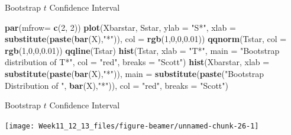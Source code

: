 \documentclass[
  ignorenonframetext,
]{beamer}
\newenvironment{Shaded}{\begin{snugshade}}{\end{snugshade}}
\newcommand{\AttributeTok}[1]{\textcolor[rgb]{0.13,0.29,0.53}{#1}}
\newcommand{\DecValTok}[1]{\textcolor[rgb]{0.00,0.00,0.81}{#1}}
\newcommand{\FloatTok}[1]{\textcolor[rgb]{0.00,0.00,0.81}{#1}}
\newcommand{\FunctionTok}[1]{\textcolor[rgb]{0.13,0.29,0.53}{\textbf{#1}}}
\newcommand{\NormalTok}[1]{#1}
\newcommand{\StringTok}[1]{\textcolor[rgb]{0.31,0.60,0.02}{#1}}
\begin{document}
\begin{frame}[fragile]{Bootstrap \(t\) Confidence Interval}
\protect\hypertarget{bootstrap-t-confidence-interval-5}{}
\tiny

\begin{Shaded}
\begin{Highlighting}[]
\FunctionTok{par}\NormalTok{(}\AttributeTok{mfrow=} \FunctionTok{c}\NormalTok{(}\DecValTok{2}\NormalTok{, }\DecValTok{2}\NormalTok{))}
\FunctionTok{plot}\NormalTok{(Xbarstar, Sstar, }\AttributeTok{ylab =} \StringTok{"S*"}\NormalTok{, }\AttributeTok{xlab =} \FunctionTok{substitute}\NormalTok{(}\FunctionTok{paste}\NormalTok{(}\FunctionTok{bar}\NormalTok{(X),}\StringTok{"*"}\NormalTok{)), }\AttributeTok{col =} \FunctionTok{rgb}\NormalTok{(}\DecValTok{1}\NormalTok{,}\DecValTok{0}\NormalTok{,}\DecValTok{0}\NormalTok{,}\FloatTok{0.01}\NormalTok{))}
\FunctionTok{qqnorm}\NormalTok{(Tstar, }\AttributeTok{col =} \FunctionTok{rgb}\NormalTok{(}\DecValTok{1}\NormalTok{,}\DecValTok{0}\NormalTok{,}\DecValTok{0}\NormalTok{,}\FloatTok{0.01}\NormalTok{))}
\FunctionTok{qqline}\NormalTok{(Tstar)}
\FunctionTok{hist}\NormalTok{(Tstar, }\AttributeTok{xlab =} \StringTok{"T*"}\NormalTok{, }\AttributeTok{main =} \StringTok{"Bootstrap distribution of T*"}\NormalTok{, }\AttributeTok{col =} \StringTok{"red"}\NormalTok{, }\AttributeTok{breaks =} \StringTok{"Scott"}\NormalTok{)}
\FunctionTok{hist}\NormalTok{(Xbarstar, }\AttributeTok{xlab =} \FunctionTok{substitute}\NormalTok{(}\FunctionTok{paste}\NormalTok{(}\FunctionTok{bar}\NormalTok{(X),}\StringTok{"*"}\NormalTok{)), }
     \AttributeTok{main =} \FunctionTok{substitute}\NormalTok{(}\FunctionTok{paste}\NormalTok{(}\StringTok{"Bootstrap Distribution of "}\NormalTok{, }\FunctionTok{bar}\NormalTok{(X),}\StringTok{"*"}\NormalTok{)), }\AttributeTok{col =} \StringTok{"red"}\NormalTok{, }\AttributeTok{breaks =} \StringTok{"Scott"}\NormalTok{)}
\end{Highlighting}
\end{Shaded}

\normalsize
\end{frame}

\begin{frame}{Bootstrap \(t\) Confidence Interval}
\protect\hypertarget{bootstrap-t-confidence-interval-6}{}
\tiny

\begin{center}\texttt{[image: Week11\_12\_13\_files/figure-beamer/unnamed-chunk-26-1]} \end{center}
\normalsize
\end{frame}
\end{document}
